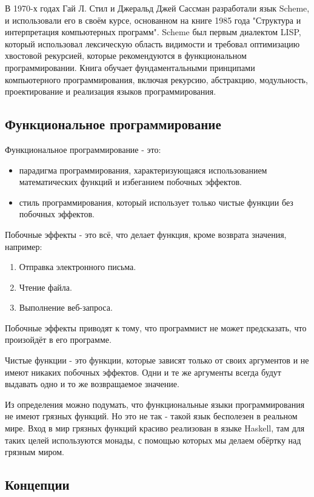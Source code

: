 В 1970-х годах Гай Л. Стил и Джеральд Джей Сассман разработали язык Scheme, и использовали его в своём курсе, основанном на книге 1985 года "Структура и интерпретация компьютерных программ"\cite{SICP}. Scheme был первым диалектом LISP, который использовал лексическую область видимости и требовал оптимизацию хвостовой рекурсией, которые рекомендуются в функциональном программировании. Книга обучает фундаментальными принципами компьютерного программирования, включая рекурсию, абстракцию, модульность, проектирование и реализация языков программирования.

\subsection{Функциональное программирование}

Функциональное программирование - это:

\begin{itemize}
	\item парадигма программирования, характеризующаяся использованием математических функций и избеганием побочных эффектов.
	\item стиль программирования, который использует только чистые функции без побочных эффектов.
\end{itemize}

Побочные эффекты - это всё, что делает функция, кроме возврата значения, например:

\begin{enumerate}
	\item Отправка электронного письма.
	\item Чтение файла.
	\item Выполнение веб-запроса.
\end{enumerate}

Побочные эффекты приводят к тому, что программист не может предсказать, что произойдёт в его программе.

Чистые функции - это функции, которые зависят только от своих аргументов и не имеют никаких побочных эффектов. 
Одни и те же аргументы всегда будут выдавать одно и то же возвращаемое значение. 

Из определения можно подумать, что функциональные языки программирования не имеют грязных функций. 
Но это не так - такой язык бесполезен в реальном мире. Вход в мир грязных функций красиво реализован в языке Haskell, там для таких целей используются монады, с помощью которых мы делаем обёртку над грязным миром.

\subsection{Концепции}

